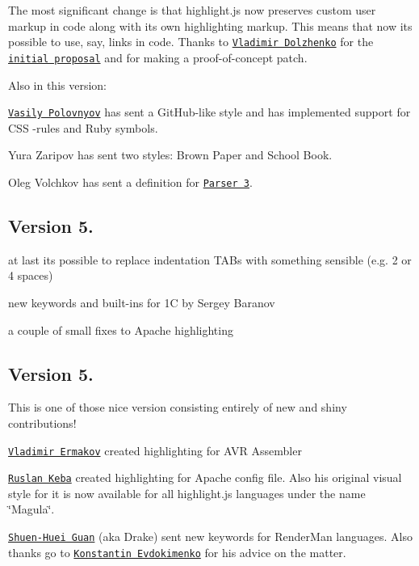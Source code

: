 The most significant change is that highlight.\+js now preserves custom user markup in code along with its own highlighting markup. This means that now it\textquotesingle{}s possible to use, say, links in code. Thanks to \href{http://dolzhenko.blogspot.com/}{\tt Vladimir Dolzhenko} for the \href{http://roudakov.ru/}{\tt initial proposal} and for making a proof-\/of-\/concept patch.

Also in this version\+:


\begin{DoxyItemize}
\item \href{http://vasily.polovnyov.ru/}{\tt Vasily Polovnyov} has sent a Git\+Hub-\/like style and has implemented support for C\+SS -\/rules and Ruby symbols.
\item Yura Zaripov has sent two styles\+: Brown Paper and School Book.
\item Oleg Volchkov has sent a definition for \href{http://www.parser.ru/}{\tt Parser 3}.
\end{DoxyItemize}

\subsection*{Version 5.}


\begin{DoxyItemize}
\item at last it\textquotesingle{}s possible to replace indentation T\+A\+Bs with something sensible (e.\+g. 2 or 4 spaces)
\item new keywords and built-\/ins for 1C by Sergey Baranov
\item a couple of small fixes to Apache highlighting
\end{DoxyItemize}

\subsection*{Version 5.}

This is one of those nice version consisting entirely of new and shiny contributions!


\begin{DoxyItemize}
\item \href{http://vehq.ru/about/}{\tt Vladimir Ermakov} created highlighting for A\+VR Assembler
\item \href{http://rukeba.com/}{\tt Ruslan Keba} created highlighting for Apache config file. Also his original visual style for it is now available for all highlight.\+js languages under the name \char`\"{}\+Magula\char`\"{}.
\item \href{http://drakeguan.org/}{\tt Shuen-\/\+Huei Guan} (aka Drake) sent new keywords for Render\+Man languages. Also thanks go to \href{http://k-evdokimenko.moikrug.ru/}{\tt Konstantin Evdokimenko} for his advice on the matter.
\end{DoxyItemize}

